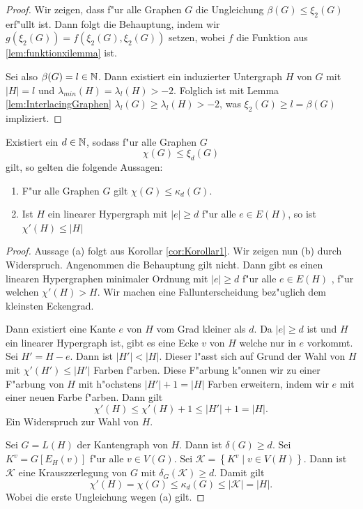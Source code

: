 \begin{proof}
  Wir zeigen, dass f"ur alle Graphen $G$ die Ungleichung $\beta(G) \leq \xi_{2}(G) $ erf"ullt ist. Dann folgt die Behauptung, indem wir $g(\xi_2(G))=f(\xi_2(G),\xi_2(G))$ setzen, wobei $f$ die Funktion aus \ref{lem:funktionxilemma} ist.

  Sei also $\beta(G) = l \in {\mathbb{N}}$. Dann existiert ein induzierter Untergraph $H$ von $G$ mit $|H| = l$ und $\lambda_{min}(H) = \lambda_{l}(H) > -2$. Folglich ist mit Lemma \ref{lem:InterlacingGraphen} $\lambda_l (G) \geq \lambda_{l}(H) > -2$, was $\xi_2(G) \geq l = \beta(G)$ impliziert.
\end{proof}

\begin{theorem}
  \label{thm:MainTheorem}
  Existiert ein $d\in {\mathbb{N}}$, sodass f"ur alle  Graphen $G$ $$\chi(G) \leq \xi_{d}(G)$$ gilt, so gelten die folgende Aussagen:
  \begin{enumerate}[label=\rm{(\alph*)}]
    \item F"ur alle Graphen $G$ gilt $\chi(G) \leq \kappa_d (G)$.
    \item  Ist $H$ ein linearer Hypergraph mit $\left|e\right| \geq d$ f"ur alle $e\in E(H)$, so ist $\chi'\left( H \right)\leq \left|H\right| $
  \end{enumerate}
\end{theorem}

\begin{proof}
  Aussage (a) folgt aus Korollar \ref{cor:Korollar1}.  
  Wir zeigen nun (b) durch Widerspruch. Angenommen die Behauptung gilt nicht. Dann gibt es einen linearen Hypergraphen minimaler Ordnung mit $|e| \geq d$ f"ur alle $e\in E(H)$ , f"ur welchen $\chi'(H) > H$. 
  Wir machen eine Fallunterscheidung bez"uglich dem kleinsten Eckengrad.

   Dann existiert eine Kante $e$ von $H$ vom Grad kleiner als $d$. Da $|e| \geq d$ ist und $H$ ein linearer Hypergraph ist, gibt es eine Ecke $v$ von $H$ welche nur in $e$ vorkommt. Sei $H'= H-e$. Dann ist $|H'| < |H|$. Dieser l"asst sich auf Grund der Wahl von $H$ mit $\chi'(H') \leq |H'|$ Farben f"arben. Diese F"arbung k"onnen wir zu einer F"arbung von $H$ mit h"ochstens $|H'|+1 = |H|$ Farben erweitern, indem wir $e$ mit einer neuen Farbe f"arben. Dann gilt 
  $$\chi'(H) \leq \chi'(H) +1  \leq |H'| +1 = |H| .$$ 
  Ein Widerspruch zur Wahl von $H$. 

   Sei $G=L(H)$ der Kantengraph von $H$. Dann ist $\delta(G) \geq d$. 
  Sei $K^{v} = G[E_{H}(v)]$ f"ur alle $v\in V(G)$. Sei $\mathcal{K}=\left\{ K^{v} \;|\; v \in V(H) \right\}$. 
  Dann ist $\mathcal{K}$ eine Krauszzerlegung von $G$ mit $\delta_{G}(\mathcal{K}) \geq d$. Damit gilt
  \begin{equation*}
    \chi'(H) = \chi(G) \leq \kappa_{d}(G) \leq |\mathcal{K}| = |H|.
  \end{equation*}
  Wobei die erste Ungleichung wegen (a) gilt. 
\end{proof}

